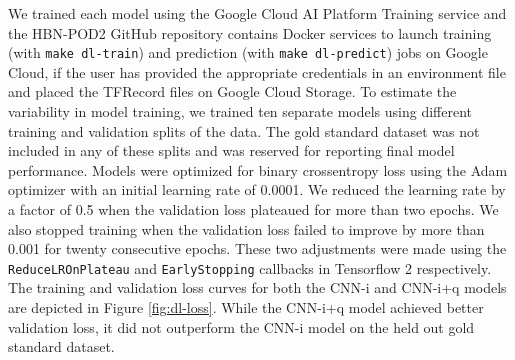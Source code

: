 \documentclass[fleqn,10pt]{wlscirep}
\begin{document}
We trained each model using the Google Cloud AI Platform Training service and
the HBN-POD2 GitHub repository contains Docker services to launch training (with
\texttt{make dl-train}) and prediction (with \texttt{make dl-predict}) jobs on
Google Cloud, if the user has provided the appropriate credentials in an
environment file and placed the TFRecord files on Google Cloud Storage. To
estimate the variability in model training, we trained ten separate models using
different training and validation splits of the data. The gold standard dataset
was not included in any of these splits and was reserved for reporting final
model performance. Models were optimized for binary crossentropy loss using the
Adam optimizer \cite{kingma2017adam} with an initial learning rate of 0.0001. We
reduced the learning rate by a factor of 0.5 when the validation loss plateaued
for more than two epochs. We also stopped training when the validation loss
failed to improve by more than 0.001 for twenty consecutive epochs. These two
adjustments were made using the \texttt{ReduceLROnPlateau} and
\texttt{EarlyStopping} callbacks in Tensorflow 2 \cite{tensorflow} respectively.
The training and validation loss curves for both the CNN-i and CNN-i+q models
are depicted in Figure \ref{fig:dl-loss}. While the CNN-i+q model achieved
better validation loss, it did not outperform the CNN-i model on the held out
gold standard dataset.
\end{document}
